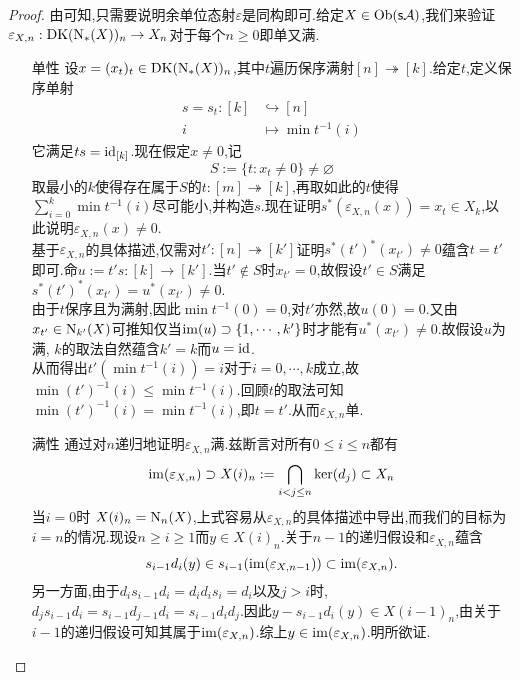 \begin{proof}
    由\parencite[定理 2.6.12.]{李文威卷一}可知,只需要说明余单位态射$\varepsilon$是同构即可.给定$X\in \operatorname{Ob}(\mathsf{s}\mathcal{A})$,我们来验证$\varepsilon_{X,n}: \operatorname{DK}(\operatorname{N}_*(X))_n \to X_n$对于每个$n \geq 0$即单又满.
    \begin{enumerate}
        \item[单性] 设$x = (x_t)_t \in \operatorname{DK}(\operatorname{N}_*(X))_n$,其中$t$遍历保序满射$[n] \twoheadrightarrow [k]$.给定$t$,定义保序单射
        \begin{align*}
        s = s_t :[k] &\hookrightarrow [n]\\
         i &\mapsto \min t^{-1}(i)
        \end{align*}
        它满足$ts = \mathrm{id}_{[k]}$.现在假定$x \neq 0$,记
        \[
        S := \{t : x_t \neq 0\}\neq \varnothing
        \]
        取最小的$k$使得存在属于$S$的$t : [m] \twoheadrightarrow [k]$,再取如此的$t$使得$\sum_{i=0}^k \min t^{-1}(i)$尽可能小,并构造$s$.现在证明$s^*(\varepsilon_{X,n}(x)) = x_t \in X_k$,以此说明$\varepsilon_{X,n}(x) \neq 0$.\\
        基于$\varepsilon_{X,n}$的具体描述,仅需对$t':[n] \twoheadrightarrow [k']$证明$s^*(t')^*(x_{t'}) \neq 0$蕴含$t = t'$即可.命$u := t' s: [k] \to [k']$.当$t' \notin S$时$x_{t'} =0$,故假设$t' \in S$满足$s^*(t')^*(x_{t'}) = u^*(x_{t'}) \neq 0$.\\
        由于$t$保序且为满射,因此$\min t^{-1}(0) =0$,对$t'$亦然,故$u(0) = 0$.又由$x_{t'}\in \operatorname{N}_{k'} (X)$可推知仅当$\operatorname{im}(u) \supset \{1,\cdots,k'\}$时才能有$u^*(x_{t'}) \neq 0$.故假设$u$为满, $k$的取法自然蕴含$k'= k$而$u = \mathrm{id}$.\\
        从而得出$t'(\min t^{-1}(i)) = i$对于$i =  0,\cdots, k$成立,故$\min (t')^{-1}(i) \leq \min t^{-1}(i)$.回顾$t$的取法可知$\min (t')^{-1}(i) = \min t^{-1}(i)$,即$t = t'$.从而$\varepsilon_{X,n}$单.
        \item[满性]通过对$n$递归地证明$\varepsilon_{X,n}$满.兹断言对所有$0 \leq i \leq n$都有
        \[
        \operatorname{im}(\varepsilon_{X,n})\supset X(i)_n := \bigcap_{i < j \leq n}\ker(d_j) \subset X_n
        \]
        当$i = 0$时 $X(i)_n = \operatorname{N}_n(X)$,上式容易从$\varepsilon_{X,n}$的具体描述中导出,而我们的目标为$i = n$的情况.现设$n\geq i \geq 1$而$y\in X(i)_n$.关于$n-1$的递归假设和$\varepsilon_{X,n}$蕴含
        \[
        s_{i-1}d_i(y) \in s_{i-1}(\operatorname{im}(\varepsilon_{X,n-1})) \subset \operatorname{im}(\varepsilon_{X,n}).
        \]
        另一方面,由于$d_is_{i-1}d_i = d_i d_{i}s_{i} = d_i$以及$j >i$时,$d_j s_{i-1} d_i = s_{i-1} d_{j-1} d_i = s_{i-1} d_i d_j$.因此$y - s_{i-1}d_i (y) \in X(i-1)_n$,由关于$i-1$的递归假设可知其属于$\operatorname{im}(\varepsilon_{X,n})$.综上$y\in \operatorname{im}(\varepsilon_{X,n})$.明所欲证.
    \end{enumerate}
\end{proof}
